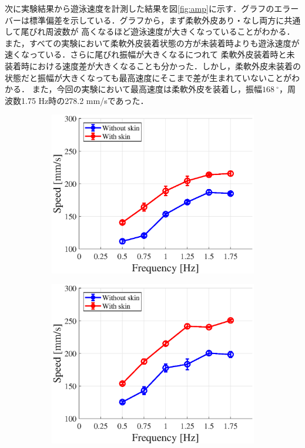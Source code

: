 次に実験結果から遊泳速度を計測した結果を図\ref{fig:amp}に示す．グラフのエラーバーは標準偏差を示している．グラフから，まず柔軟外皮あり・なし両方に共通して尾びれ周波数が
高くなるほど遊泳速度が大きくなっていることがわかる．また，すべての実験において柔軟外皮装着状態の方が未装着時よりも遊泳速度が速くなっている．さらに尾びれ振幅が大きくなるにつれて
柔軟外皮装着時と未装着時における速度差が大きくなることも分かった．しかし，柔軟外皮未装着の状態だと振幅が大きくなっても最高速度にそこまで差が生まれていないことがわかる．
また，今回の実験において最高速度は柔軟外皮を装着し，振幅$168\:^\circ$，周波数1.75 Hz時の278.2 mm/sであった．

\begin{figure}[t]
   \centering  
   \begin{subfigure}[b]{0.49\linewidth}
       \centering
       \includegraphics[width=1\linewidth]{chapters/picture/an90.eps}
       \label{fig:an90}
   \end{subfigure} %
   \begin{subfigure}[b]{0.49\linewidth}
       \centering
       \includegraphics[width=1\linewidth]{chapters/picture/an135.eps}

\end{subfigure}
\end{figure}
